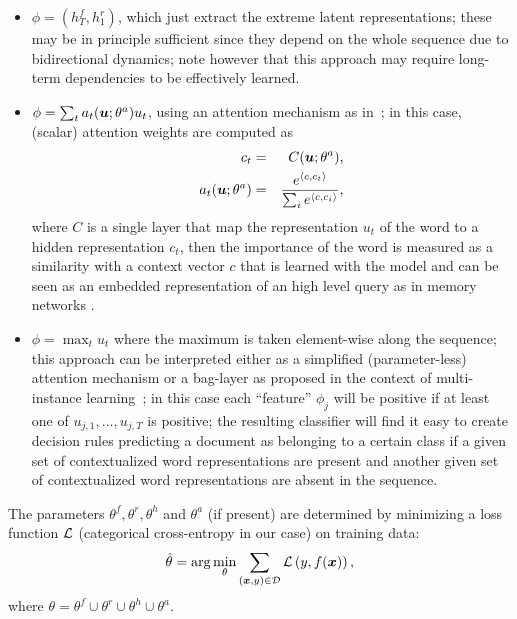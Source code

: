 \begin{itemize}
\item $\phi=(h^f_T,h^r_1)$, which just
  extract the extreme latent representations; these may be in
  principle sufficient since they depend on the whole sequence due to
  bidirectional dynamics; note however that this approach may require
  long-term dependencies to be effectively learned.
\item
  $\phi = \sum_t a_t(\bm{u};\theta^a) u_t$,
  using an attention mechanism as in~\cite{yang_hierarchical_2016}; in
  this case, (scalar) attention weights are computed as
  \begin{align*}
    c_t&=&C(\bm{u};\theta^a),\\
    a_t(\bm{u};\theta^a) &=& \frac{e^{\langle c, c_t\rangle}}
    {\sum_i{e^{\langle c, c_i\rangle}}},\\
  \end{align*}
  where $C$ is a single layer that map the representation $u_t$ of the
  word to a hidden representation $c_t$, then the importance of the word is
  measured as a similarity with a context vector $c$ that is learned
  with the model and can be seen as an embedded representation of an
  high level query as in memory networks \cite{sukhbaatar2015end}.
\item $\phi = \max_t u_t$ where the maximum is taken element-wise
  along the sequence; this approach can be interpreted either as a
  simplified (parameter-less) attention mechanism or a bag-layer as
  proposed in the context of multi-instance
  learning~\cite{tibo2017network}; in this case each ``feature''
  $\phi_j$ will be positive if at least one of $u_{j,1},\dots,u_{j,T}$
  is positive; the resulting classifier will find it easy to create
  decision rules predicting a document as belonging to a certain class
  if a given set of contextualized word representations are present
  and another given set of contextualized word representations are
  absent in the sequence.
\end{itemize}

The parameters $\theta^f,\theta^r,\theta^h$ and $\theta^a$ (if
present) are determined by minimizing a loss function $\mathcal{L}$
(categorical cross-entropy in our case) on training data:
\begin{equation}
  \hat \theta = \mathrm{arg}\min_\theta\sum_{(\bm{x},y)\in\mathcal{D}}\mathcal{L}\left(y,f(\bm{x})\right),
\end{equation}
where $\theta=\theta^f\cup\theta^r\cup\theta^h\cup\theta^a$.

